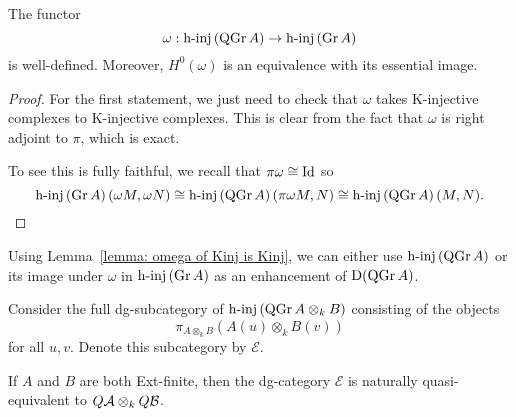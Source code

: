 \begin{lemma} \label{lemma: omega of Kinj is Kinj}
  The functor 
  \begin{displaymath}
    \omega : \operatorname{h-inj}\left(\operatorname{QGr}A\right) \to \operatorname{h-inj}\left(\operatorname{Gr}A\right)
  \end{displaymath}
  is well-defined. Moreover, \(H^0(\omega)\) is an equivalence with its essential image. 
\end{lemma}

\begin{proof}
  For the first statement, we just need to check that \(\omega\) takes K-injective complexes to K-injective complexes. 
  This is clear from the fact that \(\omega\) is right adjoint to \(\pi\), which is exact.
  
  To see this is fully faithful, we recall that \(\pi \omega \cong \operatorname{Id}\) so
  \[\operatorname{h-inj}\left(\operatorname{Gr}A\right)(\omega M, \omega N) \cong \operatorname{h-inj}\left(\operatorname{QGr}A\right)(\pi\omega M, N) \cong \operatorname{h-inj}\left(\operatorname{QGr}A\right)(M,N).\]
\end{proof}

\begin{remark} \label{remark: enhancement of DQGr}
  Using Lemma~\ref{lemma: omega of Kinj is Kinj}, we can either use \(\operatorname{h-inj}\left(\operatorname{QGr}A\right)\) or its image under \(\omega\) in \(\operatorname{h-inj}\left(\operatorname{Gr}A\right)\) as an enhancement of \(\mathrm{D}(\operatorname{QGr}A)\). 
\end{remark}

Consider the full dg-subcategory of \(\operatorname{h-inj}\left(\operatorname{QGr}A \otimes_k B\right)\) consisting of the objects
\[\pi_{A \otimes_k B} (A(u) \otimes_k B(v))\]
for all \(u,v\). Denote this subcategory by \(\mathcal E\).

\begin{lemma} \label{lemma: another model for QA otimes QB}
  If \(A\) and \(B\) are both Ext-finite, then the dg-category \(\mathcal E\) is naturally quasi-equivalent to \(Q \mathcal{A} \otimes_k Q \mathcal{B}\).
\end{lemma}

